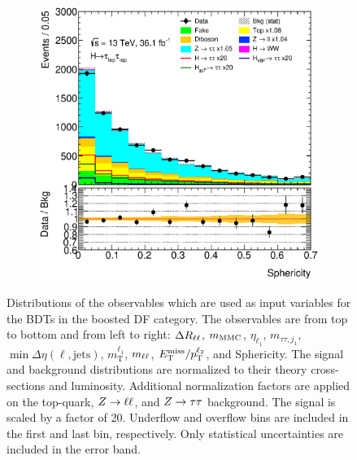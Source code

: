 \begin{figure}[htb]
\begin{subfigure}[t]{0.3\textwidth}
    \end{subfigure}
    \begin{subfigure}[t]{0.3\textwidth}
        \includegraphics[width=\textwidth]{./plots/mva/modeling/input_vars/BOOST_DF/ll-CutMVABoostedCatDF-Sphericity-lin.eps}
    \end{subfigure}
    \caption{Distributions of the observables which are used as input variables for the BDTs in the boosted DF category.
             The observables are from top to bottom and from left to right: $\Delta R_{\ell\ell}$, $m_\text{MMC}$, $\eta_{\ell_1}$, $m_{\tau\tau,j_{1}}$,
             $\min \Delta \eta (\ell, \text{jets})$, $m_\text{T}^{\ell_1}$, $m_{\ell\ell}$, $E_\text{T}^\text{miss} / p_\text{T}^{\ell_2}$, and Sphericity.
             The signal and background distributions are normalized to their theory cross-sections and luminosity.
             Additional normalization factors are applied on the top-quark, $Z \to \ell \ell$, and $Z \to \tau \tau$ background.
             The signal is scaled by a factor of 20.
             Underflow and overflow bins are included in the first and last bin, respectively.
             Only statistical uncertainties are included in the error band.}\label{fig:mva:modeling:sr:boostdf}
\end{figure}

